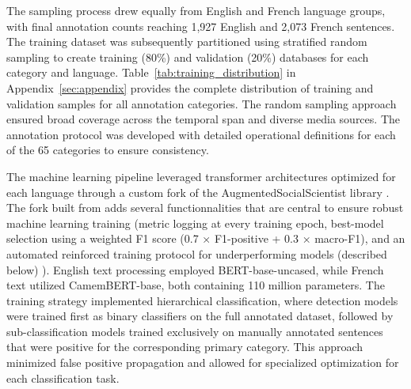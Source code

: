 \documentclass[12pt]{article}
\renewcommand\_{\texttt{\detokenize{_}\allowbreak}}
\begin{document}
The sampling process drew equally from English and French language groups, with final annotation counts reaching 1,927 English and 2,073 French sentences. The training dataset was subsequently partitioned using stratified random sampling to create training (80\%) and validation (20\%) databases for each category and language. Table~\ref{tab:training_distribution} in Appendix~\ref{sec:appendix} provides the complete distribution of training and validation samples for all annotation categories. The random sampling approach ensured broad coverage across the temporal span and diverse media sources. The annotation protocol was developed with detailed operational definitions for each of the 65 categories to ensure consistency.

The machine learning pipeline leveraged transformer architectures optimized for each language through a custom fork of the AugmentedSocialScientist library \autocite{do_augmented_2022, lemor_antoinelemoraugmentedsocialscientistfork_2025}. The fork built from \textcite{do_augmented_2022} adds several functionnalities that are central to ensure robust machine learning training (metric logging at every training epoch, best-model selection using a weighted F1 score (0.7 × F1-positive + 0.3 × macro-F1), and an automated reinforced training protocol for underperforming models (described below) \autocite{lemor_antoinelemoraugmentedsocialscientistfork_2025}). English text processing employed BERT-base-uncased, while French text utilized CamemBERT-base, both containing 110 million parameters. The training strategy implemented hierarchical classification, where detection models were trained first as binary classifiers on the full annotated dataset, followed by sub-classification models trained exclusively on manually annotated sentences that were positive for the corresponding primary category. This approach minimized false positive propagation and allowed for specialized optimization for each classification task.
\end{document}
